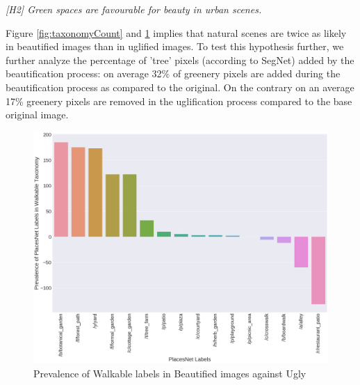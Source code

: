 \par
\textit{[H2] Green spaces are favourable for beauty in urban scenes.  }
\par

Figure \ref{fig:taxonomyCount} and \ref{fig:WalkableTnomy} implies that natural scenes are twice as likely in beautified images than in uglified images. To test this hypothesis further, we further analyze the percentage of 'tree' pixels (according to SegNet) added by the beautification process: on average 32\% of greenery pixels are added during the beautification process as compared to the original. On the contrary on an average 17\% greenery pixels are removed in the uglification process compared to the base original image. %

\begin{figure}[h]
	\centering
	\includegraphics[width=\columnwidth]{Plot/walkable_taxonomy.png}
	\caption{Prevalence of Walkable labels in Beautified images against Ugly}
	\label{fig:WalkableTnomy}
\end{figure}




